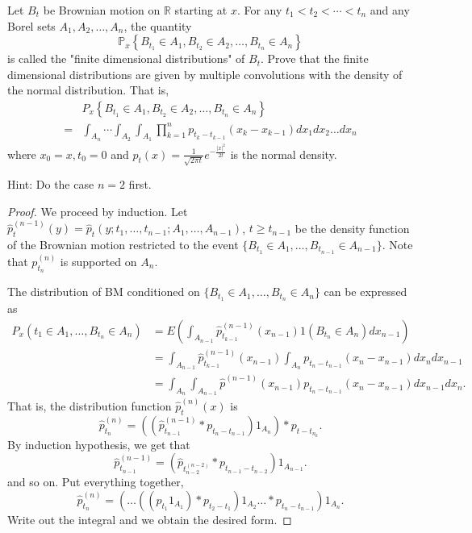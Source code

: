 \begin{problem}
	Let $B_t$ be Brownian motion on $\mathbb{R}$ starting at $x$. For any $t_1<t_2<\cdots<t_n$ and any Borel sets $A_1, A_2, \ldots, A_n$, the quantity
\[
\mathbb{P}_x\left\{B_{t_1} \in A_1, B_{t_2} \in A_2, \ldots, B_{t_n} \in A_n\right\}
\]
is called the "finite dimensional distributions" of $B_t$. Prove that the finite dimensional distributions are given by multiple convolutions with the density of the normal distribution. That is,
\[
\begin{aligned}
& P_x\left\{B_{t_1} \in A_1, B_{t_2} \in A_2, \ldots, B_{t_n} \in A_n\right\} \\
= & \int_{A_n} \cdots \int_{A_2} \int_{A_1} \prod_{k=1}^n p_{t_k-t_{k-1}}\left(x_k-x_{k-1}\right) d x_1 d x_2 \ldots d x_n
\end{aligned}
\]
where $x_0=x, t_0=0$ and $p_t(x)=\frac{1}{\sqrt{2 \pi t}} e^{-\frac{|x|^2}{2 t}}$ is the normal density.

Hint: Do the case $n=2$ first.
\end{problem}
\begin{proof}
	We proceed by induction. Let $\hat{p}_{t}^{(n-1)} (y) = \hat{p}_{t}\left(y; t_1, \ldots, t_{n-1}; A_1, \ldots, A_{n-1}\right)$, $t \ge  t_{n-1}$ be the density function of the Brownian motion restricted to the event $\{B_{t_1} \in A_1, \ldots, B_{t_{n-1}} \in A_{n-1}\} $. Note that $p^{(n)}_{t_n}$ is supported on $A_n$.

	The distribution of BM conditioned on $\{B_{t_1} \in A_1, \ldots, B_{t_{n}} \in A_{n}\} $ can be expressed as
	\begin{align*}
		P_x\left( t_1 \in A_1, \ldots, B_{t_n} \in A_n \right) 
		&= E \left(\int _{A_{n-1}} \hat{p}_{t_{k-1}}^{(n-1)}(x_{n-1}) 1\left( B_{t_n} \in A_n \right) d x_{n-1}\right)\\
		&= \int _{A_{n-1}} \hat{p}^{(n-1)}_{t_{k-1}} (x_{n-1}) \int_{A_n} p_{t_n - t_{n-1}}(x_n - x_{n-1}) d x_n d x_{n-1}\\
		&= \int _{A_n} \int _{A_{n-1}} \hat{p}^{(n-1)}(x_{n-1}) p_{t_n - t_{n-1}}(x_n - x_{n-1}) dx_{n-1} dx_n
	.\end{align*} 
	That is, the distribution function $\hat{p}_t ^{(n)}(x)$ is
	\[
		\hat{p} ^{(n)}_{t_n} = ((\hat{p} ^{(n-1)}_{t_{n-1}} * p_{t_{n} - t_{n-1}}) 1_{A_n}) * p_{t - t_{n_k}}
	.\] 
	By induction hypothesis, we get that
	\[
		\hat{p} _{t_{n-1}}^{(n-1)} = \left( \hat{p} _{t_{n-2}^{(n-2)}} * p_{t_{n-1} - t_{n-2}}\right) 1_{A_{n-1}}
	.\] 
	and so on. Put everything together,
	\[
		\hat{p} _{t_n}^{(n)}= \left(\ldots\left(\left( p_{t_1} 1_{A_{1}} \right) * p_{t_2 - t_1}\right)1_{A_2}\ldots * p_{t_{n} - t_{n-1}}\right)1_{A_n}
	.\] 
	Write out the integral and we obtain the desired form.
\end{proof}

